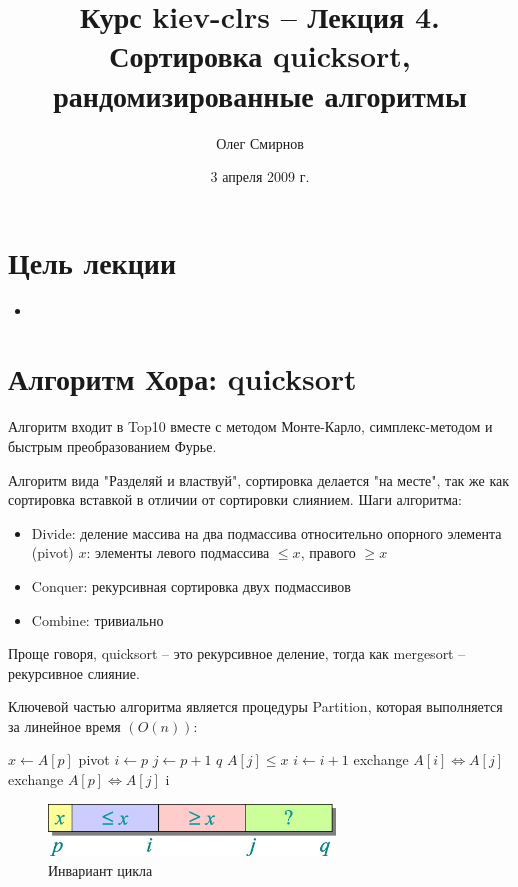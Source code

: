 \documentclass[11pt]{article}
\author{Олег Смирнов}
\title{Курс kiev-clrs -- Лекция 4. Сортировка quicksort, рандомизированные алгоритмы}
\date{3 апреля 2009 г.}
\begin{document}
\maketitle
\tableofcontents

\newpage
\setlength{\parskip}{1ex plus 0.5ex minus 0.2ex}
\section{Цель лекции}
\begin{itemize}
\item 
\end{itemize}

\section{Алгоритм Хора: quicksort}

Алгоритм входит в Top10 вместе с методом Монте-Карло, симплекс-методом и быстрым преобразованием Фурье.

Алгоритм вида "Разделяй и властвуй", сортировка делается "на месте", так же как сортировка вставкой в отличии от сортировки слиянием. Шаги алгоритма:

\begin{itemize}
\item Divide: деление массива на два подмассива относительно опорного элемента (pivot) $x$: элементы левого подмассива $\leqslant x$, правого $\geqslant x$
\item Conquer: рекурсивная сортировка двух подмассивов
\item Combine: тривиально
\end{itemize}
Проще говоря, quicksort -- это рекурсивное деление, тогда как mergesort -- рекурсивное слияние.

Ключевой частью алгоритма является процедуры Partition, которая выполняется за линейное время $(O(n))$:

\begin{codebox}
\li	$x \gets A[p]$	\Comment pivot
\li	$i \gets p$
\li	\For $j \gets p+1$ \To $q$
\li		\Do \If $A[j] \leqslant x$
\li		\Then $i \gets i+1$
\li			exchange $A[i] \iff A[j]$
		\End
	\End
\li	exchange $A[p] \iff A[j]$
\li \Return i
\End
\end{codebox}

\begin{figure}[ht]
  \centering
  \includegraphics[width=3in]{lecture4/invariant.eps}
  \caption{Инвариант цикла}
  \label{fig:invariant}
\end{figure}
\end{document}
